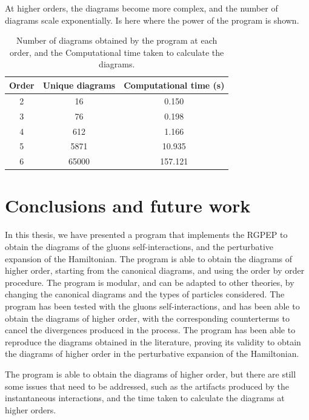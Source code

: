 \documentclass[11pt,a4paper,twoside,pdf]{article}
\numberwithin{equation}{section}
\begin{document}
At higher orders, the diagrams become more complex, and the number of diagrams scale 
exponentially. Is here where the power of the program is shown. 

\begin{table} [h!]
    \centering
    \begin{tabular}{|c|c|c|}
        \hline
        Order & Unique diagrams & Computational time (s)\\
        \hline
        2  & 16 & 0.150\\
        3  & 76 & 0.198\\
        4  & 612 & 1.166\\
        5  & 5871  & 10.935\\
        6  & 65000  & 157.121\\
        \hline
    \end{tabular}
    \caption{Number of diagrams obtained by the program at each order, and the Computational
    time taken to calculate the diagrams.}
    \label{tab:diagrams}
\end{table}

\newpage

\section{Conclusions and future work} \label{sec:conclusions}


In this thesis, we have presented a program that implements the RGPEP to obtain the
diagrams of the gluons self-interactions, and the perturbative expansion of the
Hamiltonian. The program is able to obtain the diagrams of higher order, starting
from the canonical diagrams, and using the order by order procedure.
The program is modular, and can be adapted to other theories, by changing the
canonical diagrams and the types of particles considered.
The program has been tested with the gluons self-interactions, and has been able to
obtain the diagrams of higher order, with the corresponding counterterms to cancel
the divergences produced in the process. The program has been able to reproduce the
diagrams obtained in the literature, proving its validity to obtain the diagrams of
higher order in the perturbative expansion of the Hamiltonian.

The program is able to obtain the diagrams of higher order, but there are still
some issues that need to be addressed, such as the artifacts produced by the
instantaneous interactions, and the time taken to calculate the diagrams at higher
orders. 
\end{document}
